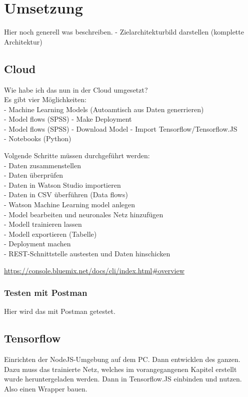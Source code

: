 \section{Umsetzung}
Hier noch generell was beschreiben. - Zielarchitekturbild darstellen (komplette Architektur)

\subsection{Cloud}
Wie habe ich das nun in der Cloud umgesetzt?\\
Es gibt vier Möglichkeiten:\\
- Machine Learning Models (Autoamtisch aus Daten generrieren)\\
- Model flows (SPSS) - Make Deployment\\
- Model flows (SPSS) - Download Model - Import Tensorflow/Tensorflow.JS\\
- Notebooks (Python)

Volgende Schritte müssen durchgeführt werden:\\
- Daten zusammenstellen\\
- Daten überprüfen\\
- Daten in Watson Studio importieren\\
- Daten in CSV überführen (Data flows)\\
- Watson Machine Learning model anlegen\\
- Model bearbeiten und neuronales Netz hinzufügen\\
- Modell trainieren lassen\\
- Modell exportieren (Tabelle)\\
- Deployment machen\\
- REST-Schnittstelle austesten und Daten hinschicken

\url{https://console.bluemix.net/docs/cli/index.html#overview}

\subsubsection{Testen mit Postman}
Hier wird das mit Postman getestet.

\subsection{Tensorflow}
Einrichten der NodeJS-Umgebung auf dem PC. Dann entwicklen des ganzen. Dazu muss das trainierte Netz, welches im
vorangegangenen Kapitel erstellt wurde heruntergeladen werden. Dann in Tensorflow.JS einbinden und nutzen. Also einen
Wrapper bauen.

